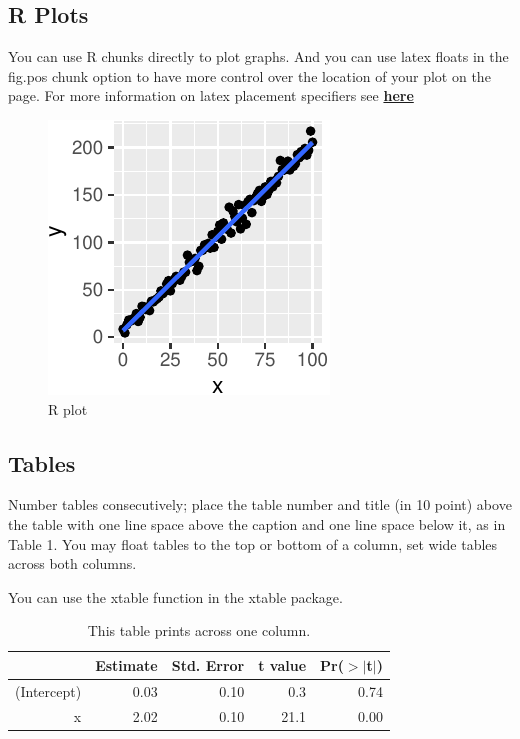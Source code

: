 \documentclass[10pt, letterpaper]{article}
\newenvironment{CodeChunk}{}{}
\begin{document}
\hypertarget{r-plots}{%
\subsection{R Plots}\label{r-plots}}

You can use R chunks directly to plot graphs. And you can use latex
floats in the fig.pos chunk option to have more control over the
location of your plot on the page. For more information on latex
placement specifiers see
\textbf{\href{https://en.wikibooks.org/wiki/LaTeX/Floats,_Figures_and_Captions}{here}}

\begin{CodeChunk}
\begin{figure}[H]

{\centering \includegraphics{figs/plot-1} 

}

\caption[R plot]{R plot}\label{fig:plot}
\end{figure}
\end{CodeChunk}

\hypertarget{tables}{%
\subsection{Tables}\label{tables}}

Number tables consecutively; place the table number and title (in 10
point) above the table with one line space above the caption and one
line space below it, as in Table 1. You may float tables to the top or
bottom of a column, set wide tables across both columns.

You can use the xtable function in the xtable package.

\begin{table}[H]
\centering
\begin{tabular}{rrrrr}
  \hline
 & Estimate & Std. Error & t value & Pr($>$$|$t$|$) \\ 
  \hline
(Intercept) & 0.03 & 0.10 & 0.3 & 0.74 \\ 
  x & 2.02 & 0.10 & 21.1 & 0.00 \\ 
   \hline
\end{tabular}
\caption{This table prints across one column.} 
\end{table}
\end{document}
